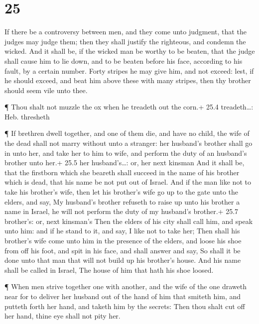 \hypertarget{section-24}{%
\section{25}\label{section-24}}

 If there be a controversy between men, and they come unto
judgment, that the judges may judge them; then they shall justify the
righteous, and condemn the wicked.  And it shall be, if the
wicked man be worthy to be beaten, that the judge shall cause him to lie
down, and to be beaten before his face, according to his fault, by a
certain number.  Forty stripes he may give him, and not
exceed: lest, if he should exceed, and beat him above these with many
stripes, then thy brother should seem vile unto thee.

 ¶ Thou shalt not muzzle the ox when he treadeth out the
corn.+ 25.4 treadeth\ldots: Heb. thresheth

 ¶ If brethren dwell together, and one of them die, and have
no child, the wife of the dead shall not marry without unto a stranger:
her husband's brother shall go in unto her, and take her to him to wife,
and perform the duty of an husband's brother unto her.+ 25.5 her
husband's\ldots: or, her next kinsman  And it shall be, that
the firstborn which she beareth shall succeed in the name of his brother
which is dead, that his name be not put out of Israel.  And
if the man like not to take his brother's wife, then let his brother's
wife go up to the gate unto the elders, and say, My husband's brother
refuseth to raise up unto his brother a name in Israel, he will not
perform the duty of my husband's brother.+ 25.7 brother's: or, next
kinsman's  Then the elders of his city shall call him, and
speak unto him: and if he stand to it, and say, I like not to take her;
 Then shall his brother's wife come unto him in the presence
of the elders, and loose his shoe from off his foot, and spit in his
face, and shall answer and say, So shall it be done unto that man that
will not build up his brother's house.  And his name shall
be called in Israel, The house of him that hath his shoe loosed.

 ¶ When men strive together one with another, and the wife
of the one draweth near for to deliver her husband out of the hand of
him that smiteth him, and putteth forth her hand, and taketh him by the
secrets:  Then thou shalt cut off her hand, thine eye shall
not pity her.


